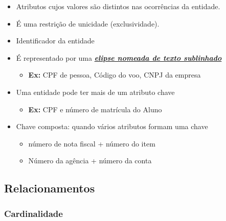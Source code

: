 \documentclass[12pt,a4paper]{article}
\begin{document}
\begin{itemize}
    \item Atributos cujos valores são distintos nas ocorrências da entidade.
    \item É uma restrição de unicidade (exclusividade).
    \item Identificador da entidade
    \item É representado por uma \textbf{\textit{\underline{elipse nomeada de texto sublinhado}}}
        \begin{itemize}
            \item \textbf{Ex:} CPF de pessoa, Código do voo, CNPJ da empresa
        \end{itemize}
    \item Uma entidade pode ter mais de um atributo chave
        \begin{itemize}
            \item \textbf{Ex:} CPF e número de matrícula do Aluno
        \end{itemize}
    \item Chave composta: quando vários atributos formam uma chave
        \begin{itemize}
            \item número de nota fiscal + número do item
            \item Número da agência + número da conta
        \end{itemize}
\end{itemize}

\subsection{Relacionamentos}

\subsubsection{Cardinalidade}
\end{document}

